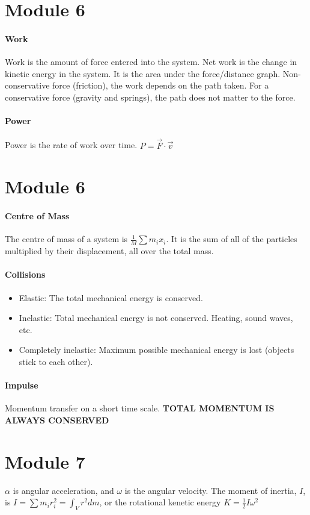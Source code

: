 \documentclass[10pt,letter]{article}
\begin{document}
\pagebreak 
\section*{Module 6}
\paragraph{Work} Work is the amount of force entered into the system. Net work is the change in kinetic energy in the system. It is the area under the force/distance graph. Non-conservative force (friction), the work depends on the path taken. For a conservative force (gravity and springs), the path does not matter to the force.
\paragraph{Power} Power is the rate of work over time. $P=\vec{F}\cdot\vec{v}$ 


\pagebreak

\section*{Module 6}
\paragraph{Centre of Mass} The centre of mass of a system is $\frac{1}{M}\sum m_ix_i$. It is the sum of all of the particles multiplied by their displacement, all over the total mass. 
\paragraph{Collisions} \begin{itemize}
    \item Elastic: The total mechanical energy is conserved. 
    \item Inelastic: Total mechanical energy is not conserved. Heating, sound waves, etc. 
    \item Completely inelastic: Maximum possible mechanical energy is lost (objects stick to each other). 
\end{itemize}
\paragraph{Impulse} Momentum transfer on a short time scale. 
\textbf{TOTAL MOMENTUM IS ALWAYS CONSERVED} 


\pagebreak

\section*{Module 7}
$\alpha$ is angular acceleration, and $\omega$ is the angular velocity. The moment of inertia, $I$, is $I=\sum m_ir_i^2=\int_V r^2dm$, or the rotational kenetic energy $K=\frac{1}{2}I\omega^2$ 
\end{document}

